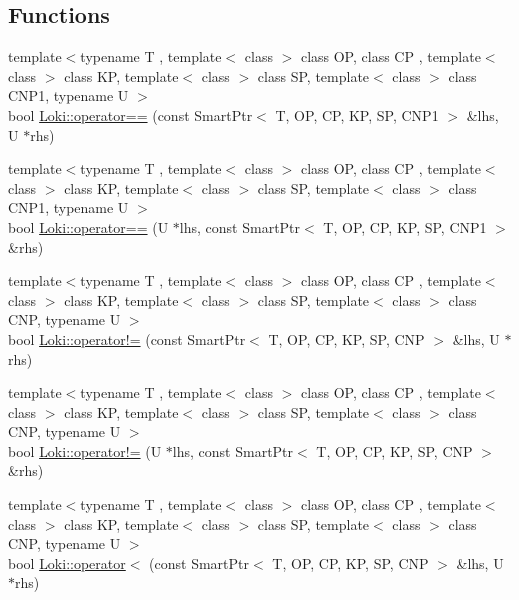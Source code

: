 \subsection*{Functions}
\begin{DoxyCompactItemize}
\item 
{\footnotesize template$<$typename T , template$<$ class $>$ class O\+P, class C\+P , template$<$ class $>$ class K\+P, template$<$ class $>$ class S\+P, template$<$ class $>$ class C\+N\+P1, typename U $>$ }\\bool \hyperlink{group__SmartPointerGroup_ga6367f7dd2ba62b272c7a14b2d5db3e01}{Loki\+::operator==} (const Smart\+Ptr$<$ T, O\+P, C\+P, K\+P, S\+P, C\+N\+P1 $>$ \&lhs, U $\ast$rhs)
\item 
{\footnotesize template$<$typename T , template$<$ class $>$ class O\+P, class C\+P , template$<$ class $>$ class K\+P, template$<$ class $>$ class S\+P, template$<$ class $>$ class C\+N\+P1, typename U $>$ }\\bool \hyperlink{group__SmartPointerGroup_ga7f01888cb34c0dd52ded70b83ee20e06}{Loki\+::operator==} (U $\ast$lhs, const Smart\+Ptr$<$ T, O\+P, C\+P, K\+P, S\+P, C\+N\+P1 $>$ \&rhs)
\item 
{\footnotesize template$<$typename T , template$<$ class $>$ class O\+P, class C\+P , template$<$ class $>$ class K\+P, template$<$ class $>$ class S\+P, template$<$ class $>$ class C\+N\+P, typename U $>$ }\\bool \hyperlink{group__SmartPointerGroup_ga4737a73b3c8d0a42d5f1f94526728f75}{Loki\+::operator!=} (const Smart\+Ptr$<$ T, O\+P, C\+P, K\+P, S\+P, C\+N\+P $>$ \&lhs, U $\ast$rhs)
\item 
{\footnotesize template$<$typename T , template$<$ class $>$ class O\+P, class C\+P , template$<$ class $>$ class K\+P, template$<$ class $>$ class S\+P, template$<$ class $>$ class C\+N\+P, typename U $>$ }\\bool \hyperlink{group__SmartPointerGroup_ga7ed292fb9144360e60f0589f7387ec67}{Loki\+::operator!=} (U $\ast$lhs, const Smart\+Ptr$<$ T, O\+P, C\+P, K\+P, S\+P, C\+N\+P $>$ \&rhs)
\item 
{\footnotesize template$<$typename T , template$<$ class $>$ class O\+P, class C\+P , template$<$ class $>$ class K\+P, template$<$ class $>$ class S\+P, template$<$ class $>$ class C\+N\+P, typename U $>$ }\\bool \hyperlink{group__SmartPointerGroup_ga1e7dc23efb70f2a1ebdf633ba941a3a9}{Loki\+::operator$<$} (const Smart\+Ptr$<$ T, O\+P, C\+P, K\+P, S\+P, C\+N\+P $>$ \&lhs, U $\ast$rhs)

\end{DoxyCompactItemize}
